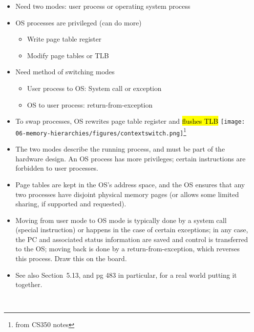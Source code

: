 

\begin{frame}[fragile]
\begin{itemize}
\item Need two modes: user process or operating system process
\item OS processes are privileged (can do more)
\begin{itemize}
\item Write page table register
\item Modify page tables or TLB
\end{itemize}
\item Need method of switching modes
\begin{itemize}
\item User process to OS: System call or exception
\item OS to user process: return-from-exception
\end{itemize}
\item To swap processes, OS rewrites page table register and \hl{flushes TLB}
\texttt{[image: 06-memory-hierarchies/figures/contextswitch.png]}\footnote{from CS350 notes}
\end{itemize}
\BNotes\ifnum{}
\begin{itemize}
\item The two modes describe the running process, and must be part of
the hardware design. An OS process has more privileges; certain
instructions are forbidden to user processes.
\item Page tables are kept in the OS's
address space, and the OS ensures that any two processes have disjoint
physical memory pages (or allows some limited sharing, if supported
and requested). 
\item Moving from user mode to OS mode is typically done by a system
	call (special instruction) or happens in the case of certain
	exceptions; in any case, the PC and associated status
	information are saved and control is transferred to the OS; moving
	back is done by a return-from-exception, which reverses this process.
	Draw this on the board.

\bigskip
\item See also Section~5.13, and pg 483 in particular, for a real world
	putting it together.
\end{itemize}
~%
\fi\ENotes
\end{frame}

